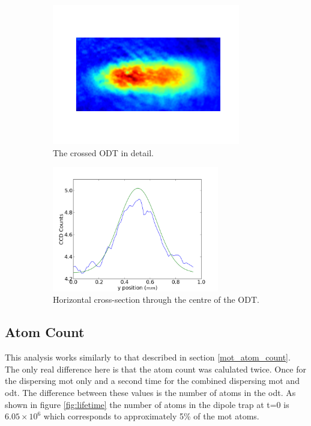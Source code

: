 \begin{figure}[h]
    \begin{subfigure}[b]{0.5\textwidth}
        \centering
        \includegraphics[width=0.9\textwidth]{figs/ODTimage1zoom.png}
        \caption{The crossed ODT in detail.}
    \end{subfigure}\begin{subfigure}[b]{0.5\textwidth}
        \centering
        \includegraphics[width=0.8\textwidth]{figs/ODTimage1y.png}
        \caption{Horizontal cross-section through the centre of the ODT.}
    \end{subfigure}

    \caption{}
    \label{fig:ODTimage1}
\end{figure}


\subsection{Atom Count}
This analysis works similarly to that described in section \ref{mot_atom_count}. The only real difference here is that the atom count was calulated twice. Once for the dispersing \gls{mot} only and a second time for the combined dispersing \gls{mot} and \gls{odt}. The difference between these values is the number of atoms in the \gls{odt}. As shown in figure \ref{fig:lifetime} the number of atoms in the dipole trap at t=0 is $6.05\times10^6$ which corresponds to approximately 5\% of the \gls{mot} atoms.

